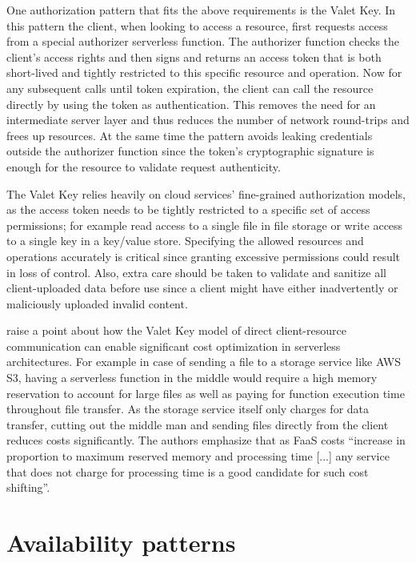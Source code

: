 One authorization pattern that fits the above requirements is the Valet Key. In this pattern the client, when looking to access a resource, first requests access from a special authorizer serverless function. The authorizer function checks the client's access rights and then signs and returns an access token that is both short-lived and tightly restricted to this specific resource and operation. Now for any subsequent calls until token expiration, the client can call the resource directly by using the token as authentication. This removes the need for an intermediate server layer and thus reduces the number of network round-trips and frees up resources. At the same time the pattern avoids leaking credentials outside the authorizer function since the token's cryptographic signature is enough for the resource to validate request authenticity. \parencite{microsoft18cloudPatterns}

The Valet Key relies heavily on cloud services' fine-grained authorization models, as the access token needs to be tightly restricted to a specific set of access permissions; for example read access to a single file in file storage or write access to a single key in a key/value store. Specifying the allowed resources and operations accurately is critical since granting excessive permissions could result in loss of control. Also, extra care should be taken to validate and sanitize all client-uploaded data before use since a client might have either inadvertently or maliciously uploaded invalid content. \parencite{microsoft18cloudPatterns}

\textcite{adzic2017serverless} raise a point about how the Valet Key model of direct client-resource communication can enable significant cost optimization in serverless architectures. For example in case of sending a file to a storage service like AWS S3, having a serverless function in the middle would require a high memory reservation to account for large files as well as paying for function execution time throughout file transfer. As the storage service itself only charges for data transfer, cutting out the middle man and sending files directly from the client reduces costs significantly. The authors emphasize that as FaaS costs ``increase in proportion to maximum reserved memory and processing time [...] any service that does not charge for processing time is a good candidate for such cost shifting''.

\section{Availability patterns} \label{sec:availabilityPatterns}

